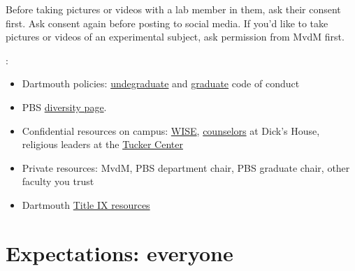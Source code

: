 \documentclass{tufte-book}
\begin{document}
Before taking pictures or videos with a lab member in them, ask their
consent first. Ask consent again before posting to social media. If
you'd like to take pictures or videos of an experimental subject, ask
permission from MvdM first.

:

\begin{itemize}
\item{Dartmouth policies: \href{https://student-affairs.dartmouth.edu/policy/standards-conduct}{undegraduate} and \href{https://graduate.dartmouth.edu/policy/code-conduct-nonacademic-regulations}{graduate} code of conduct}
\item{PBS \href{https://pbs.dartmouth.edu/diversity}{diversity page}.}
\item{Confidential resources on campus:
  \href{http://www.wiseuv.org/dartmouth---home.html}{WISE},
  \href{https://students.dartmouth.edu/health-service/counseling/about/clinical-services/counseling}{counselors}
  at Dick's House, religious leaders at the
  \href{https://students.dartmouth.edu/tucker/about/pastoral-counseling}{Tucker
    Center}}
\item{Private resources: MvdM, PBS department chair, PBS graduate
  chair, other faculty you trust}
\item{Dartmouth \href{https://journeys.dartmouth.edu/knowyourrights/resources/}{Title IX resources}}
\end{itemize}

\section{Expectations: everyone}

\end{document}
